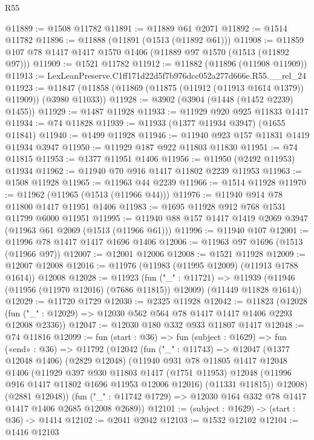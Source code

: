 \begin{lexlean}{R55}
\begin{coremodule}
{{@11889 := @1508 @11782
@11891 := @11889 @61 @2071
@11892 := @1514 @11782
@11896 := @11888 (@11891 (@1513 (@11892 @61)))
@11908 := @11859 @107 @78 @1417 @1417 @1570 @1406 (@11889 @97 @1570 (@1513 (@11892 @97)))
@11909 := @1521 @11782
@11912 := @11882 (@11896 (@11908 @11909))
@11913 := LexLeanPreserve.C1ff171d22d5f7b976dcc052a277d666e.R55.__rel_24
@11923 := @11847 (@11858 (@11869 (@11875 (@11912 (@11913 @1614 @1379)) @11909)) (@3980 @11033))
@11928 := @3902 (@3904 (@1448 (@1452 @2239) @1455))
@11929 := @1487 @11928
@11933 := @11929 @920 @925 @11833 @1417
@11934 := @74 @11828
@11939 := @11933 (@1377 @11934 @3947) (@1655 @11841)
@11940 := @1499 @11928
@11946 := @11940 @923 @157 @11831 @1419 @11934 @3947
@11950 := @11929 @187 @922 @11803 @11830
@11951 := @74 @11815
@11953 := @1377 @11951 @1406
@11956 := @11950 (@2492 @11953) @11934
@11962 := @11940 @70 @916 @1417 @11802 @2239 @11953
@11963 := @1508 @11928
@11965 := @11963 @44 @2239
@11966 := @1514 @11928
@11970 := @11962 (@11965 (@1513 (@11966 @44)))
@11976 := @11940 @914 @78 @11800 @1417 @11951 @1406
@11983 := @1695 @11928 @912 @768 @1531 @11799 @6000 @11951
@11995 := @11940 @88 @157 @1417 @1419 @2069 @3947 (@11963 @61 @2069 (@1513 (@11966 @61)))
@11996 := @11940 @107
@12001 := @11996 @78 @1417 @1417 @1696 @1406
@12006 := @11963 @97 @1696 (@1513 (@11966 @97))
@12007 := @12001 @12006
@12008 := @1521 @11928
@12009 := @12007 @12008
@12016 := @11976 (@11983 (@11995 @12009) (@11913 @1788 @1614)) @12008
@12028 := @11923
    (fun ("_" : @11721) =>
    @11939 (@11946 (@11956 (@11970 @12016) (@7686 @11815)) @12009) (@11449 @11828 @1614))
@12029 := @11720 @1729
@12030 := @2325 @11928
@12042 := @11823
    (@12028 (fun ("_" : @12029) => @12030 @562 @564 @78 @1417 @1417 @1406 @2293 @12008 @2336))
@12047 := @12030 @180 @332 @933 @11807 @1417
@12048 := @74 @11816
@12099 := fun (start : @36) =>
  fun (subject : @1629) =>
  fun («end» : @36) =>
  @11792
    (@12042
      (fun ("_" : @11743) =>
      @12047
        (@1377 @12048 @1406)
        (@2829 @12048)
        (@11940
          @931
          @78
          @11805
          @1417
          @12048
          @1406
          (@11929
            @397
            @930
            @11803
            @1417
            (@1751 @11953)
            @12048
            (@11996 @916 @1417 @11802 @1696 @11953 @12006 @12016)
            (@11331 @11815))
          @12008)
        (@2881 @12048))
      (fun ("_" : @11742 @1729) => @12030 @164 @332 @78 @1417 @1417 @1406 @2685 @12008 @2689))
@12101 := (subject : @1629) -> (start : @36) -> @1414
@12102 := @2041 @2042
@12103 := @1532 @12102
@12104 := @1416 @12103
}}
\end{coremodule}
\end{lexlean}
